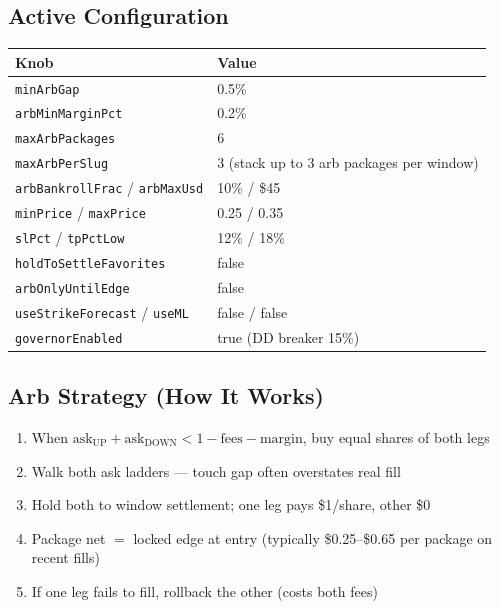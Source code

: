\documentclass[11pt,a4paper]{article}
\begin{document}
\subsection{Active Configuration}
\begin{table}[h]
\centering
\small
\begin{tabular}{@{}ll@{}}
\toprule
\textbf{Knob} & \textbf{Value} \\
\midrule
\texttt{minArbGap} & 0.5\% \\
\texttt{arbMinMarginPct} & 0.2\% \\
\texttt{maxArbPackages} & 6 \\
\texttt{maxArbPerSlug} & 3 (stack up to 3 arb packages per window) \\
\texttt{arbBankrollFrac} / \texttt{arbMaxUsd} & 10\% / \$45 \\
\texttt{minPrice} / \texttt{maxPrice} & 0.25 / 0.35 \\
\texttt{slPct} / \texttt{tpPctLow} & 12\% / 18\% \\
\texttt{holdToSettleFavorites} & false \\
\texttt{arbOnlyUntilEdge} & false \\
\texttt{useStrikeForecast} / \texttt{useML} & false / false \\
\texttt{governorEnabled} & true (DD breaker 15\%) \\
\bottomrule
\end{tabular}
\end{table}

\subsection{Arb Strategy (How It Works)}
\begin{enumerate}[noitemsep]
  \item When $\text{ask}_{\text{UP}} + \text{ask}_{\text{DOWN}} < 1 - \text{fees} - \text{margin}$, buy equal shares of both legs
  \item Walk both ask ladders --- touch gap often overstates real fill
  \item Hold both to window settlement; one leg pays \$1/share, other \$0
  \item Package net $=$ locked edge at entry (typically \$0.25--\$0.65 per package on recent fills)
  \item If one leg fails to fill, rollback the other (costs both fees)
\end{enumerate}

\end{document}
